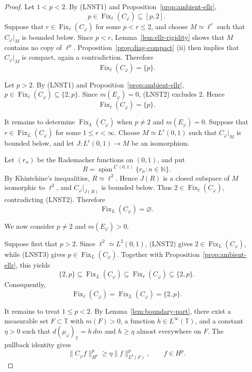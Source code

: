 \documentclass[10pt,a4paper]{amsart}
\newcommand{\T}{\mathbb{T}}
\begin{document}
\begin{proof}
Let \(1<p<2\). By \textup{(LNST1)} and
Proposition~\ref{prop:ambient-ellr},
\[
        p
        \in
        \operatorname{Fix}_{\ell}(C_\varphi)
        \subseteq
        [p,2].
\]
Suppose that
\(r\in\operatorname{Fix}_{\ell}(C_\varphi)\) for some \(p<r\le2\),
and choose \(M\simeq\ell^r\) such that \(C_\varphi|_M\) is bounded
below. Since \(p<r\),
Lemma~\ref{lem:ellr-rigidity} shows that \(M\) contains no
copy of \(\ell^p\).
Proposition~\ref{prop:diag-compact}%
\textup{(ii)} then implies that \(C_\varphi|_M\) is compact, again a
contradiction. Therefore
\[
        \operatorname{Fix}_{\ell}(C_\varphi)=\{p\}.
\]

Let \(p>2\). By \textup{(LNST1)} and
Proposition~\ref{prop:ambient-ellr},
\(p\in\operatorname{Fix}_{\ell}(C_\varphi)\subseteq\{2,p\}\).
Since \(m(E_\varphi)=0\), \textup{(LNST2)} excludes \(2\). Hence
\[
        \operatorname{Fix}_{\ell}(C_\varphi)=\{p\}.
\]

It remains to determine
\(\operatorname{Fix}_{L}(C_\varphi)\) when \(p\ne2\) and
\(m(E_\varphi)=0\). Suppose that
\(r\in\operatorname{Fix}_{L}(C_\varphi)\) for some
\(1\le r<\infty\). Choose \(M\simeq L^r(0,1)\) such that
\(C_\varphi|_M\) is bounded below, and let
\(J:L^r(0,1)\to M\) be an isomorphism.

Let \((r_n)\) be the Rademacher functions on \((0,1)\), and put
\[
        R
        =
        \overline{\operatorname{span}}^{\,L^r(0,1)}
        \{r_n:n\in\mathbb N\}.
\]
By Khintchine's inequalities, \(R\simeq\ell^2\). Hence \(J(R)\)
is a closed subspace of \(M\) isomorphic to \(\ell^2\), and
\(C_\varphi|_{J(R)}\) is bounded below. Thus
\(2\in\operatorname{Fix}_{\ell}(C_\varphi)\), contradicting
\textup{(LNST2)}. Therefore
\[
        \operatorname{Fix}_{L}(C_\varphi)=\varnothing.
\]

We now consider \(p\ne2\) and \(m(E_\varphi)>0\).

Suppose first that \(p>2\). Since
\(\ell^2\simeq L^2(0,1)\), \textup{(LNST2)} gives
\(2\in\operatorname{Fix}_{L}(C_\varphi)\), while
\textup{(LNST3)} gives
\(p\in\operatorname{Fix}_{L}(C_\varphi)\). Together with
Proposition~\ref{prop:ambient-ellr}, this yields
\[
        \{2,p\}
        \subseteq
        \operatorname{Fix}_{L}(C_\varphi)
        \subseteq
        \operatorname{Fix}_{\ell}(C_\varphi)
        \subseteq
        \{2,p\}.
\]
Consequently,
\[
        \operatorname{Fix}_{\ell}(C_\varphi)
        =
        \operatorname{Fix}_{L}(C_\varphi)
        =
        \{2,p\}.
\]

It remains to treat \(1\le p<2\). By
Lemma~\ref{lem:boundary-part}, there exist a measurable set
\(F\subset\T\) with \(m(F)>0\), a function
\(h\in L^\infty(\T)\), and a constant \(\eta>0\) such that
\(d(\mu_\varphi)_\T=h\,dm\) and \(h\ge\eta\) almost everywhere on
\(F\). The pullback identity gives
\begin{equation}
\label{eq:diag-lower}
        \|C_\varphi f\|_{H^p}^p
        \ge
        \eta\|f\|_{L^p(F)}^p,
        \qquad
        f\in H^p.
\end{equation}


\end{proof}
\end{document}
